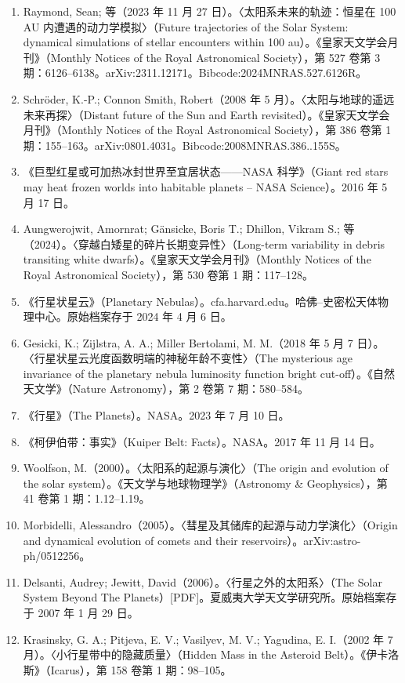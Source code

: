 \begin{enumerate}
\item Raymond, Sean; 等（2023 年 11 月 27 日）。〈太阳系未来的轨迹：恒星在 100 AU 内遭遇的动力学模拟〉（Future trajectories of the Solar System: dynamical simulations of stellar encounters within 100 au）。《皇家天文学会月刊》（Monthly Notices of the Royal Astronomical Society），第 527 卷第 3 期：6126–6138。arXiv:2311.12171。Bibcode:2024MNRAS.527.6126R。
\item Schröder, K.-P.; Connon Smith, Robert（2008 年 5 月）。〈太阳与地球的遥远未来再探〉（Distant future of the Sun and Earth revisited）。《皇家天文学会月刊》（Monthly Notices of the Royal Astronomical Society），第 386 卷第 1 期：155–163。arXiv:0801.4031。Bibcode:2008MNRAS.386..155S。
\item 《巨型红星或可加热冰封世界至宜居状态——NASA 科学》（Giant red stars may heat frozen worlds into habitable planets – NASA Science）。2016 年 5 月 17 日。
\item Aungwerojwit, Amornrat; Gänsicke, Boris T.; Dhillon, Vikram S.; 等（2024）。〈穿越白矮星的碎片长期变异性〉（Long-term variability in debris transiting white dwarfs）。《皇家天文学会月刊》（Monthly Notices of the Royal Astronomical Society），第 530 卷第 1 期：117–128。
\item 《行星状星云》（Planetary Nebulas）。cfa.harvard.edu。哈佛–史密松天体物理中心。原始档案存于 2024 年 4 月 6 日。
\item Gesicki, K.; Zijlstra, A. A.; Miller Bertolami, M. M.（2018 年 5 月 7 日）。〈行星状星云光度函数明端的神秘年龄不变性〉（The mysterious age invariance of the planetary nebula luminosity function bright cut-off）。《自然天文学》（Nature Astronomy），第 2 卷第 7 期：580–584。
\item 《行星》（The Planets）。NASA。2023 年 7 月 10 日。
\item 《柯伊伯带：事实》（Kuiper Belt: Facts）。NASA。2017 年 11 月 14 日。
\item Woolfson, M.（2000）。〈太阳系的起源与演化〉（The origin and evolution of the solar system）。《天文学与地球物理学》（Astronomy & Geophysics），第 41 卷第 1 期：1.12–1.19。
\item Morbidelli, Alessandro（2005）。〈彗星及其储库的起源与动力学演化〉（Origin and dynamical evolution of comets and their reservoirs）。arXiv:astro-ph/0512256。
\item Delsanti, Audrey; Jewitt, David（2006）。〈行星之外的太阳系〉（The Solar System Beyond The Planets）[PDF]。夏威夷大学天文学研究所。原始档案存于 2007 年 1 月 29 日。
\item Krasinsky, G. A.; Pitjeva, E. V.; Vasilyev, M. V.; Yagudina, E. I.（2002 年 7 月）。〈小行星带中的隐藏质量〉（Hidden Mass in the Asteroid Belt）。《伊卡洛斯》（Icarus），第 158 卷第 1 期：98–105。

\end{enumerate}
